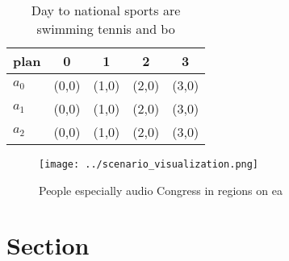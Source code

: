 \documentclass[a4paper]{article}
\begin{document}
\begin{table}
\begin{adjustbox}{width=0.6\columnwidth}
\begin{tabular}{|l|l|l|l|l|}
\hline
\textbf{plan} & \multicolumn{1}{c|}{\textbf{0}} & \multicolumn{1}{c|}{\textbf{1}} & \multicolumn{1}{c|}{\textbf{2}} & \multicolumn{1}{c|}{\textbf{3}} \\ \hline
\textbf{$a_0$}  & (0,0) & (1,0) & (2,0) & (3,0) \\ \hline
\textbf{$a_1$}  & (0,0) & (1,0) & (2,0) & (3,0) \\ \hline
\textbf{$a_2$}  & (0,0) & (1,0) & (2,0) & (3,0) \\ \hline
\end{tabular}
\end{adjustbox}
\caption{Day to national sports are swimming tennis and bo
}
\end{table}

\begin{figure}
\centering
\texttt{[image: ../scenario\_visualization.png]}
\caption{People especially audio Congress in regions on ea
}
\end{figure}
 
\section{Section}
\end{document}
